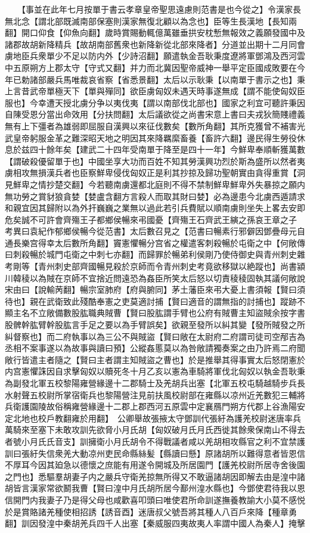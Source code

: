 　　【事並在此年七月按單于書云孝章皇帝聖思遠慮則范書是也今從之】令漢家長無北念【謂北部既滅南部保塞則漢家無復北顧以為念也】臣等生長漢地【長知兩翻】開口仰食【仰魚向翻】歲時賞賜動輒億萬雖垂拱安枕慙無報效之義願發國中及諸郡故胡新降精兵【故胡南部舊衆也新降新從北部來降者】分道並出期十二月同會虜地臣兵衆單少不足以防内外【少詩沼翻】願遣執金吾耿秉度遼將軍鄧鴻及西河雲中五原朔方上郡太守【守式又翻】并力而北冀因聖帝威神一舉平定臣國成敗要在今年已勅諸部嚴兵馬唯裁哀省察【省悉景翻】太后以示耿秉【以南單于書示之也】秉上言昔武帝單極天下【單與殫同】欲臣虜匈奴未遇天時事遂無成【謂不能使匈奴臣服也】今幸遭天授北虜分争以夷伐夷【謂以南部伐北部也】國家之利宜可聽許秉因自陳受恩分當出命效用【分扶問翻】太后議欲從之尚書宋意上書曰夫戎狄簡賤禮義無有上下彊者為雄弱即屈服自漢興以來征伐數矣【數所角翻】其所克獲曾不補害光武皇帝躬服金革之難深昭天地之明因其來降羈縻畜養【畜許六翻】邊民得生勞役休息於兹四十餘年矣【建武二十四年受南單于降至是四十一年】今鮮卑奉順斬獲萬數【謂破殺優留單于也】中國坐享大功而百姓不知其勞漢興功烈於斯為盛所以然者夷虜相攻無損漢兵者也臣察鮮卑侵伐匈奴正是利其抄掠及歸功聖朝實由貪得重賞【洞見鮮卑之情抄楚交翻】今若聽南虜還都北庭則不得不禁制鮮卑鮮卑外失暴掠之願内無功勞之賞豺狼貪婪【婪盧含翻方言殺人而取其財曰婪】必為邊患今北虜西遁請求和親宜因其歸附以為外扞巍巍之業無以過此若引兵費賦以順南虜則坐失上畧去安即危矣誠不可許會齊殤王子都鄉侯暢來弔國憂【齊殤王石齊武王縯之孫哀王章之子　考異曰袁紀作郁鄉侯暢今從范書】太后數召見之【范書曰暢素行邪僻因鄧疊母元自通長樂宫得幸太后數所角翻】竇憲懼暢分宫省之權遣客刺殺暢於屯衛之中【何敞傳曰刺殺暢於城門屯衛之中刺七亦翻】而歸罪於暢弟利侯剛乃使侍御史與青州刺史雜考剛等【青州刺史部齊國暢見殺於京師而令青州刺史考竟欲移獄以絶蹤也】尚書潁川韓稜以為賊在京師不宜捨近問遠恐為姦臣所笑太后怒以切責稜稜固執其議何敞說宋由曰【說輸苪翻】暢宗室肺府【府與腑同】茅土藩臣來弔大憂上書須報【賢曰須待也】親在武衛致此殘酷奉憲之吏莫適討捕【賢曰適音的謂無指的討捕也】蹤跡不顯主名不立敞備數股肱職典賊曹【賢曰股肱謂手臂也公府有賊曹主知盜賊余按字書股髀幹肱臂幹股肱言手足之要以為手臂誤矣】欲親至發所以糾其變【發所賊發之所糾督察也】而二府執事以為三公不與賊盜【賢曰敞在太尉府二府謂司徒司空邴吉為丞相不案事遂以為故事與讀曰預】公縱姦慝莫以為咎敞請獨奏案之由乃許焉二府聞敞行皆遣主者隨之【賢曰主者謂主知賊盜之曹也】於是推舉其得事實太后怒閉憲於内宫憲懼誅因自求擊匈奴以贖死冬十月乙亥以憲為車騎將軍伐北匈奴以執金吾耿秉為副發北軍五校黎陽雍營緣邊十二郡騎士及羌胡兵出塞【北軍五校屯騎越騎步兵長水射聲五校尉所掌宿衛兵也黎陽營注見前扶風校尉部在雍縣以凉州近羌數犯三輔將兵衛護園陵故俗稱雍營緣邊十二郡上郡西河五原雲中定襄鴈門朔方代郡上谷漁陽安定北地也校戶教翻雍於用翻】　公卿舉故張掖太守鄧訓代張紆為護羌校尉迷唐率兵萬騎來至塞下未敢攻訓先欲脅小月氏胡【匈奴破月氏月氏西徙其餘衆保南山不得去者號小月氏氏音支】訓擁衛小月氏胡令不得戰議者咸以羌胡相攻縣官之利不宜禁護訓曰張紆失信衆羌大動凉州吏民命縣絲髪【縣讀曰懸】原諸胡所以難得意者皆恩信不厚耳今因其廹急以德懷之庶能有用遂令開城及所居園門【護羌校尉所居寺舍後園之門也】悉驅羣胡妻子内之嚴兵守衛羌掠無所得又不敢逼諸胡因即解去由是湟中諸胡皆言漢家常欲鬭我曹【賢曰湟中月氏胡所居今鄯州湟水縣也】今鄧使君待我以恩信開門内我妻子乃是得父母也咸歡喜叩頭曰唯使君所命訓遂撫養教諭大小莫不感悦於是賞賂諸羌種使相招誘【誘音酉】迷唐叔父號吾將其種人八百戶來降【種章勇翻】訓因發湟中秦胡羌兵四千人出塞【秦威服四夷故夷人率謂中國人為秦人】掩擊